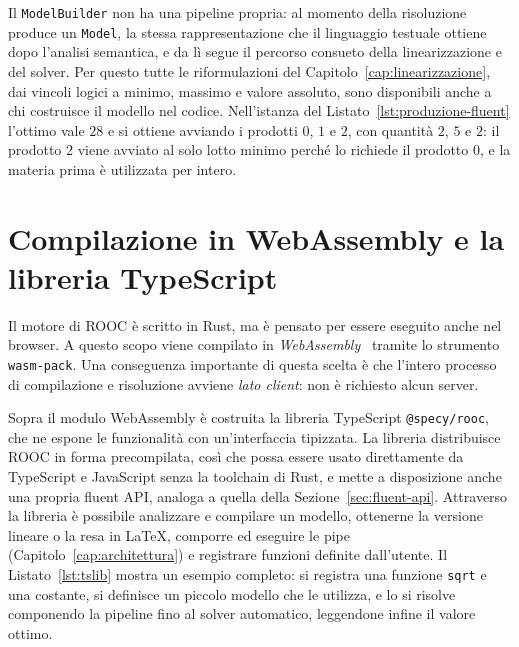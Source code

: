 Il \texttt{ModelBuilder} non ha una pipeline propria: al momento della
risoluzione produce un \texttt{Model}, la stessa rappresentazione che il
linguaggio testuale ottiene dopo l'analisi semantica, e da lì segue il percorso
consueto della linearizzazione e del solver. Per questo tutte le riformulazioni
del Capitolo~\ref{cap:linearizzazione}, dai vincoli logici a minimo, massimo e
valore assoluto, sono disponibili anche a chi costruisce il modello nel codice.
Nell'istanza del Listato~\ref{lst:produzione-fluent} l'ottimo vale $28$ e si
ottiene avviando i prodotti $0$, $1$ e $2$, con quantità $2$, $5$ e $2$: il
prodotto $2$ viene avviato al solo lotto minimo perché lo richiede il prodotto
$0$, e la materia prima è utilizzata per intero.

\section{Compilazione in WebAssembly e la libreria TypeScript}
\label{sec:wasm}

Il motore di ROOC è scritto in Rust, ma è pensato per essere eseguito anche nel
browser. A questo scopo viene compilato in \emph{WebAssembly}~\cite{webassembly}
tramite lo strumento \texttt{wasm-pack}.
Una conseguenza importante di questa scelta è che l'intero processo di
compilazione e risoluzione avviene \emph{lato client}: non è richiesto alcun
server.

Sopra il modulo WebAssembly è costruita la libreria TypeScript
\texttt{@specy/rooc}, che ne espone le funzionalità con un'interfaccia tipizzata.
La libreria distribuisce ROOC in forma precompilata, così che possa essere usato
direttamente da TypeScript e JavaScript senza la toolchain di Rust, e mette a
disposizione anche una propria fluent API, analoga a quella della
Sezione~\ref{sec:fluent-api}. Attraverso la libreria è possibile analizzare e compilare un modello, ottenerne la
versione lineare o la resa in LaTeX, comporre ed eseguire le pipe
(Capitolo~\ref{cap:architettura}) e registrare funzioni definite dall'utente. Il
Listato~\ref{lst:tslib} mostra un esempio completo: si registra una funzione
\texttt{sqrt} e una costante, si definisce un piccolo modello che le utilizza, e
lo si risolve componendo la pipeline fino al solver automatico, leggendone infine
il valore ottimo.

